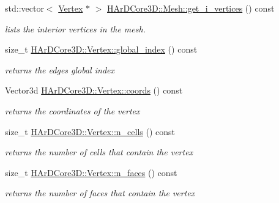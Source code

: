 \begin{DoxyCompactItemize}
\mbox{\label{group__Mesh_ga272a2fb7e29331652482190f45e30c02}} 
std\+::vector$<$ \hyperlink{classHArDCore3D_1_1Vertex}{Vertex} $\ast$ $>$ \hyperlink{group__Mesh_ga272a2fb7e29331652482190f45e30c02}{H\+Ar\+D\+Core3\+D\+::\+Mesh\+::get\+\_\+i\+\_\+vertices} () const
\begin{DoxyCompactList}\small\item\em lists the interior vertices in the mesh. \end{DoxyCompactList}\item 
\mbox{\label{group__Mesh_gab6a570ed052f6bb7ad6570f83cbae6a9}} 
size\+\_\+t \hyperlink{group__Mesh_gab6a570ed052f6bb7ad6570f83cbae6a9}{H\+Ar\+D\+Core3\+D\+::\+Vertex\+::global\+\_\+index} () const
\begin{DoxyCompactList}\small\item\em returns the edges global index \end{DoxyCompactList}\item 
\mbox{\label{group__Mesh_ga8b06a63ada3bfd88e6429e5cfd028c0b}} 
Vector3d \hyperlink{group__Mesh_ga8b06a63ada3bfd88e6429e5cfd028c0b}{H\+Ar\+D\+Core3\+D\+::\+Vertex\+::coords} () const
\begin{DoxyCompactList}\small\item\em returns the coordinates of the vertex \end{DoxyCompactList}\item 
\mbox{\label{group__Mesh_ga52a24c4c5fbdc474b5a5e379d037f2e4}} 
size\+\_\+t \hyperlink{group__Mesh_ga52a24c4c5fbdc474b5a5e379d037f2e4}{H\+Ar\+D\+Core3\+D\+::\+Vertex\+::n\+\_\+cells} () const
\begin{DoxyCompactList}\small\item\em returns the number of cells that contain the vertex \end{DoxyCompactList}\item 
\mbox{\label{group__Mesh_ga0a651dc9116346e6a7304848ed538cc3}} 
size\+\_\+t \hyperlink{group__Mesh_ga0a651dc9116346e6a7304848ed538cc3}{H\+Ar\+D\+Core3\+D\+::\+Vertex\+::n\+\_\+faces} () const
\begin{DoxyCompactList}\small\item\em returns the number of faces that contain the vertex \end{DoxyCompactList}\item 

\end{DoxyCompactItemize}

